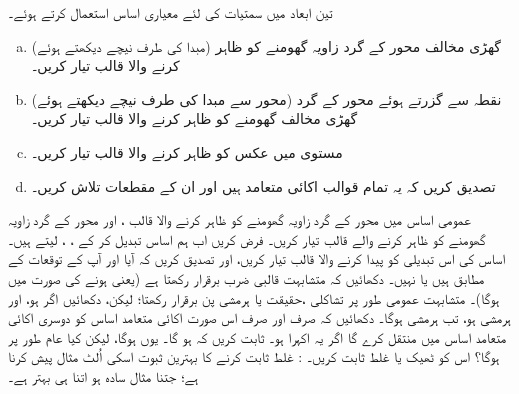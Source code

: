 تین ابعاد میں سمتیات کی لئے معیاری اساس  استعمال کرتے ہوئے۔
\begin{enumerate}[a.]
\item
(مبدا  کی طرف نیچے دیکھتے ہوئے)  گھڑی مخالف محور  کے گرد زاویہ  گھومنے کو ظاہر کرنے والا قالب تیار کریں۔
\item
نقطہ  سے گزرتے ہوئے محور کے گرد (محور سے  مبدا کی طرف نیچے دیکھتے ہوئے) گھڑی مخالف  گھومنے کو ظاہر کرنے والا قالب تیار کریں۔
\item
 مستوی  میں عکس کو ظاہر کرنے والا قالب تیار کریں۔
\item
 تصدیق کریں کہ یہ تمام قوالب اکائی متعامد ہیں اور ان کے مقطعات تلاش  کریں۔
\end{enumerate}
عمومی اساس  میں  محور  کے گرد زاویہ  گھومنے کو ظاہر کرنے والا قالب ،  اور محور  کے گرد زاویہ  گھومنے کو ظاہر کرنے والے قالب  تیار کریں۔ فرض کریں اب ہم اساس تبدیل کر کے ، ،  لیتے ہیں۔  اساس کی اس تبدیلی کو پیدا کرنے والا قالب تیار کریں،  اور تصدیق کریں کہ آیا
  اور  آپ کے توقعات کے مطابق ہیں یا نہیں۔
دکھائیں کہ متشابہت قالبی ضرب برقرار رکھتا ہے (یعنی   ہونے کی صورت میں   ہوگا)۔  متشابہت عمومی طور پر   تشاکلی ،حقیقت یا ہرمشی پن برقرار  رکھتا؛  لیکن،  دکھائیں اگر    ہو،  اور  ہرمشی ہو،  تب  ہرمشی ہوگا۔ دکھائیں کہ  صرف اور صرف  اس صورت اکائی متعامد اساس کو دوسری اکائی متعامد اساس میں منتقل کرے گا اگر یہ اکہرا ہو۔
ثابت کریں  کہ  ہو گا۔ یوں
  ہوگا، لیکن  کیا عام طور پر
   ہوگا؟ اس کو ٹھیک یا غلط ثابت کریں۔ : غلط ثابت کرنے کا  بہترین ثبوت  اسکی اُلٹ مثال پیش کرنا ہے؛  جتنا مثال سادہ ہو  اتنا ہی بہتر ہے۔

